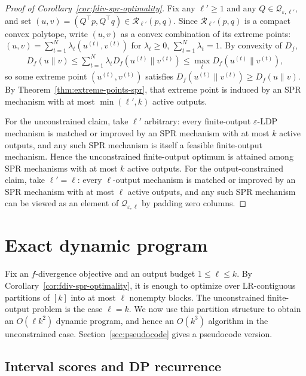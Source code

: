 \documentclass{article}
\theoremstyle{plain}
\theoremstyle{definition}
\theoremstyle{plain}
\newcommand{\eps}{\varepsilon}
\begin{document}
\begin{proof}[Proof of Corollary~\ref{cor:fdiv-spr-optimality}]
    Fix any $\ell'\ge 1$ and any $Q\in\mathcal Q_{\eps,\ell'}$, and set $(u,v)=(Q^\top p,Q^\top q)\in\mathcal R_{\ell'}(p,q)$. Since $\mathcal R_{\ell'}(p,q)$ is a compact convex polytope, write $(u,v)$ as a convex combination of its extreme points: $(u,v)=\sum_{t=1}^N \lambda_t(u^{(t)},v^{(t)})$ for $\lambda_t\ge 0$, $\sum_{t=1}^N\lambda_t=1$.
    By convexity of $D_f$,
    \begin{align}
        D_f(u\|v)
        \le \sum_{t=1}^N \lambda_t D_f(u^{(t)}\|v^{(t)})
        \le \max_t D_f(u^{(t)}\|v^{(t)}),
    \end{align}
so some extreme point $(u^{(t)},v^{(t)})$ satisfies $D_f(u^{(t)}\|v^{(t)}) \ge D_f(u\|v)$. By Theorem~\ref{thm:extreme-points-spr}, that extreme point is induced by an SPR mechanism with at most $\min(\ell',k)$ active outputs.

For the unconstrained claim, take $\ell'$ arbitrary: every finite-output $\eps$-LDP mechanism is matched or improved by an SPR mechanism with at most $k$ active outputs, and any such SPR mechanism is itself a feasible finite-output mechanism. Hence the unconstrained finite-output optimum is attained among SPR mechanisms with at most $k$ active outputs. For the output-constrained claim, take $\ell'=\ell$: every $\ell$-output mechanism is matched or improved by an SPR mechanism with at most $\ell$ active outputs, and any such SPR mechanism can be viewed as an element of $\mathcal Q_{\eps,\ell}$ by padding zero columns.
\end{proof}

\section{Exact dynamic program}
\label{sec:dynamic-program}
\label{sec:polynomial-time-algorithm}

Fix an $f$-divergence objective and an output budget $1\le \ell\le k$. By Corollary~\ref{cor:fdiv-spr-optimality}, it is enough to optimize over LR-contiguous partitions of $[k]$ into at most $\ell$ nonempty blocks. The unconstrained finite-output problem is the case $\ell=k$. We now use this partition structure to obtain an $O(\ell k^2)$ dynamic program, and hence an $O(k^3)$ algorithm in the unconstrained case. Section~\ref{sec:pseudocode} gives a pseudocode version.

\subsection{Interval scores and DP recurrence}
\label{sec:dp-interval-scores}
\label{sec:dp-recurrence}
\end{document}
